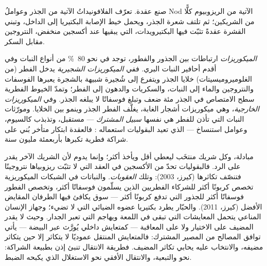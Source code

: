 \begin{omfigure}
{\small صنع عقدة. تعرّف الفلافونيداتُ الآتية من الجذر
وعواملُ Nod الآتية من الريزوبيوم كلًّا من الشريكين؛ ثم
تلتف شعرة الجذر، ويحمل خيط الإصابة البكتيريا إلى الداخل،
وتبني القشرة عقدةً تثبّت فيها البكتيرويدات، التي يبقيها
 عند أكسجين منخفض، النتروجين مقابل السكر.}
\end{omfigure}

\begin{definition}[الميكوريزات]\label{def:b3:microbiomes:mycorrhiza}
\emph{الميكوريزات} ارتباطات بين الجذور والفطور، توجد في
نحو \qty{80}{\%} من أنواع النبات وفي أقدم أحافير النبات
البري. ففي \emph{الميكوريزات الشجيرية} يدخل الفطر (من
الغلوميروميسيتات) خلايا الجذر ويتفرع إلى شُجيرة شبيهة
بالشجرة يعبرها الفوسفات والنتروجين والماء إلى النبات،
والسكريات والدهون إلى الفطر؛ وتمدّ الخيوط الفطرية سطح
الامتصاص في الجذر مئة ضعف وتبلغ فوسفاتًا لا يبلغه الجذر.
وفي \emph{الميكوريزات الخارجية}، وهي ميكوريزات أشجار
الغابة، يغلّف الفطر الجذر وينمو بين الخلايا. ومورّثات
النبات التي تأذن للفطر هي نفسها \emph{سبيل 
المشترك} --- مستقبل، وتذبذب كالسيوم، وعوامل استنساخ ---
الذي تعيد البقوليات استعماله : فالعقدة ابتكار
متأخر بُني على شراكة فطرية تكبرها بأربعمئة مليون سنة.
\end{definition}

\begin{proposition}\label{prop:b3:microbiomes:sanctions}
 مبادلة، وكل شريك منتخَب ليعطي أقل ويأخذ أكثر؛
وإنما يدوم لأن الشريك الآخر يقدر على الرد. فالبقوليات تحدّ
من الأكسجين في العقد التي لا تثبّت ريزوبياها نتروجينًا
فتنصّف تكاثرها (كيرز، 2003): وتلك \emph{العقوبات}.
والنباتات في الشبكات الميكوريزية تخصص كربونًا أكثر للشركاء
الفطريين الذين يسلّمون فوسفاتًا أكثر، وتخصص الفطور
فوسفاتًا أكثر للجذور التي تدفع كربونًا أكثر --- سوق يكافئ
فيها الطرفان المقايض الأفضل (كيرز، 2011). والحبّار يطرد
بكتيريا عضوه الضيائي التي لا تضيء؛ وجهاز الإنسان المناعي
يتحمل المعايشات التي تبقى في اللمعة ويهاجم التي تعبر
الجدار. وحيث لا يقدر المضيف على الاختيار ولا على المعاقبة
--- كمتعايش داخلي يُورَّث عبر البيضة --- يأتي توافق
المصالح من المصير المشترك: فالمتعايش المنتقل عموديًا لا
يتكاثر إلا حين يتكاثر مضيفه، والانتخاب عليه يحابي تكاثر
المضيف. فطريقة الانتقال تنبئ إذن بطبيعة الشراكة:  نحو  والتبعية، والانتقال الأفقي نحو
الاستغلال الذي يكبحه الضبط.
\end{proposition}
\admitted

